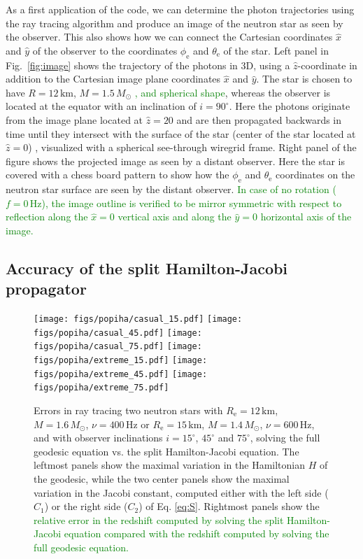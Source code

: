 \documentclass{aa}
\newcommand{\refe}[1]{\textcolor{green}{{#1}}}
\newcommand{\Msun}{\ensuremath{M_{\odot}}}
\begin{document}
As a first application of the code, we can determine the photon trajectories using the ray tracing algorithm and produce an image of the neutron star as seen by the observer.
This also shows how we can connect the Cartesian coordinates $\hat{x}$ and $\hat{y}$ of the observer to the coordinates $\phi_{\mathrm{e}}$ and $\theta_{\mathrm{e}}$ of the star.
Left panel in Fig.~\ref{fig:image} shows the trajectory of the photons in 3D, using a $\hat{z}$-coordinate in addition to the Cartesian image plane coordinates $\hat{x}$ and $\hat{y}$.
The star is chosen to have $R=12\,\mathrm{km}$, $M=1.5\,\Msun$ \refe{, and spherical shape}, whereas the observer is located at the equator with an inclination of $i = 90^{\circ}$.
Here the photons originate from the image plane located at $\hat{z} = 20$ and are then propagated backwards in time until they intersect with the surface of the star (center of the star located at $\hat{z} = 0$) , visualized with a spherical see-through wiregrid frame.
Right panel of the figure shows the projected image as seen by a distant observer.
Here the star is covered with a chess board pattern to show how the $\phi_{\mathrm{e}}$ and $\theta_{\mathrm{e}}$ coordinates on the neutron star surface are seen by the distant observer.
\refe{In case of no rotation ($f = 0\,\mathrm{Hz}$), the image outline is verified to be mirror symmetric with respect to reflection along the $\hat{x} = 0$ vertical axis and along the $\hat{y} = 0$ horizontal axis of the image.}


\subsection{Accuracy of the split Hamilton-Jacobi propagator}

\begin{figure}[htbp!]
\centering
\texttt{[image: figs/popiha/casual\_15.pdf]}
\texttt{[image: figs/popiha/casual\_45.pdf]}
\texttt{[image: figs/popiha/casual\_75.pdf]}
\texttt{[image: figs/popiha/extreme\_15.pdf]}
\texttt{[image: figs/popiha/extreme\_45.pdf]}
\texttt{[image: figs/popiha/extreme\_75.pdf]}
\caption{\label{fig:H_C1_C2}
    Errors in ray tracing two neutron stars with $R_{\mathrm{e}}=12\,\mathrm{km}$, $M=1.6\,\Msun$, $\nu=400\,\mathrm{Hz}$ or $R_{\mathrm{e}}=15\,\mathrm{km}$, $M=1.4\,\Msun$, $\nu=600\,\mathrm{Hz}$, and with observer inclinations $i=15^\circ$, $45^\circ$ and $75^\circ$, solving the full geodesic equation vs. the split Hamilton-Jacobi equation.
    The leftmost panels show the maximal variation in the Hamiltonian $H$ of the geodesic, while the two center panels show the maximal variation in the Jacobi constant, computed either with the left side ($C_1$) or the right side ($C_2$) of Eq. \eqref{eq:S}.
    Rightmost panels show the \refe{relative error in the redshift computed by solving the split Hamilton-Jacobi equation compared with the redshift computed by solving the full geodesic equation.}
}
\end{figure}
\end{document}
